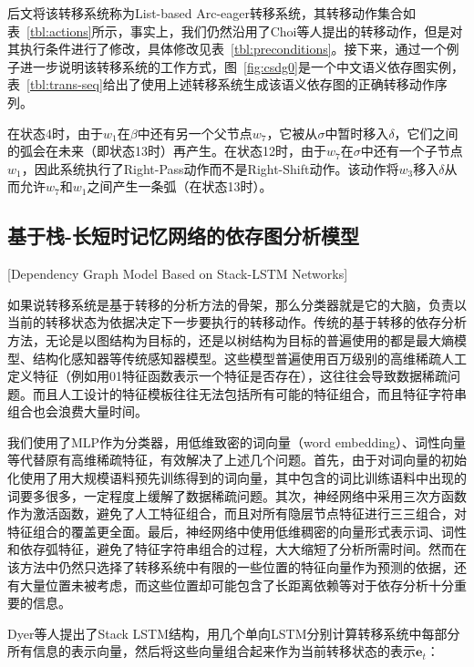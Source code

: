 后文将该转移系统称为List-based Arc-eager转移系统，其转移动作集合如表~\ref{tbl:actions}所示，事实上，我们仍然沿用了Choi等人提出的转移动作，但是对其执行条件进行了修改，具体修改见表~\ref{tbl:preconditions}。接下来，通过一个例子进一步说明该转移系统的工作方式，图~\ref{fig:csdg0}是一个中文语义依存图实例，表~\ref{tbl:trans-seq}给出了使用上述转移系统生成该语义依存图的正确转移动作序列。

在状态4时，由于$w_1$在$\beta$中还有另一个父节点$w_7$，它被从$\sigma$中暂时移入$\delta$，它们之间的弧会在未来（即状态13时）再产生。在状态12时，由于$w_7$在$\sigma$中还有一个子节点$w_1$，因此系统执行了Right-Pass动作而不是Right-Shift动作。该动作将$w_3$移入$\delta$从而允许$w_7$和$w_1$之间产生一条弧（在状态13时）。


\subsection{基于栈-长短时记忆网络的依存图分析模型}[Dependency Graph Model Based on Stack-LSTM Networks]

如果说转移系统是基于转移的分析方法的骨架，那么分类器就是它的大脑，负责以当前的转移状态为依据决定下一步要执行的转移动作。传统的基于转移的依存分析方法，无论是以图结构为目标的\cite{Titov:2009:OGP:1661445.1661696,sagae2008shift,Zhang:2016:TPD:3030588.3030589}，还是以树结构为目标的\cite{yamada2003statistical,nivre-hall-nilsson:2004:CONLL,nivre2008algorithms}普遍使用的都是最大熵模型、结构化感知器等传统感知器模型。这些模型普遍使用百万级别的高维稀疏人工定义特征（例如用01特征函数表示一个特征是否存在），这往往会导致数据稀疏问题。而且人工设计的特征模板往往无法包括所有可能的特征组合，而且特征字符串组合也会浪费大量时间。

我们使用了MLP作为分类器\cite{wang2016transition}，用低维致密的词向量（word embedding）、词性向量等代替原有高维稀疏特征，有效解决了上述几个问题。首先，由于对词向量的初始化使用了用大规模语料预先训练得到的词向量，其中包含的词比训练语料中出现的词要多很多，一定程度上缓解了数据稀疏问题。其次，神经网络中采用三次方函数作为激活函数，避免了人工特征组合，而且对所有隐层节点特征进行三三组合，对特征组合的覆盖更全面。最后，神经网络中使用低维稠密的向量形式表示词、词性和依存弧特征，避免了特征字符串组合的过程，大大缩短了分析所需时间。然而在该方法中仍然只选择了转移系统中有限的一些位置的特征向量作为预测的依据，还有大量位置未被考虑，而这些位置却可能包含了长距离依赖等对于依存分析十分重要的信息。

Dyer等人提出了Stack LSTM结构，\cite{dyer-EtAl:2015:ACL-IJCNLP}用几个单向LSTM分别计算转移系统中每部分所有信息的表示向量，然后将这些向量组合起来作为当前转移状态的表示$\mathbf{e}_t$：


